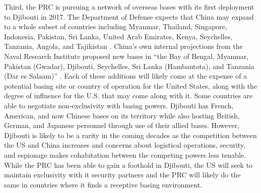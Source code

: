 {	%
	Third, the PRC is pursuing a network of overseas bases with its first deployment to Djibouti in 2017. The Department of Defense expects that China may expand to a whole subset of countries including Myanmar, Thailand, Singapore, Indonesia, Pakistan, Sri Lanka, United Arab Emirates, Kenya, Seychelles, Tanzania, Angola, and Tajikistan \cite{OSD2020}. China's own internal projections from the Naval Research Institute proposed new bases in ``the Bay of Bengal, Myanmar, Pakistan (Gwadar), Djibouti, Seychelles, Sri Lanka (Hambantota), and Tanzania (Dar es Salaam)'' \cite[p. 207]{Doshi2021}. Each of these additions will likely come at the expense of a potential basing site or country of operation for the United States, along with the degree of influence for the U.S. that may come along with it. Some countries are able to negotiate non-exclusivity with basing powers. Djibouti has French, American, and now Chinese bases on its territory while also hosting British, German, and Japanese personnel through use of their allied bases. However, Djibouti is likely to be a rarity in the coming decades as the competition between the US and China increases and concerns about logistical operations, security, and espionage makes cohabitation between the competing powers less tenable. While the PRC has been able to gain a foothold in Djibouti, the US will seek to maintain exclusivity with it security partners and the PRC will likely do the same in countries where it finds a receptive basing environment.
	
}
